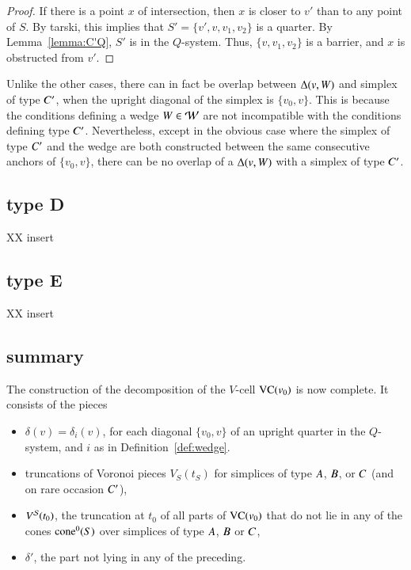 \begin{proof} If there is a point $x$ of intersection, then
$x$ is closer to $v'$ than to any point of $S$. 
By tarski, this implies that 
$S'=\{v',v,v_1,v_2\}$ is a quarter.  By Lemma~\ref{lemma:C'Q},
$S'$ is in the $Q$-system.  Thus, $\{v,v_1,v_2\}$ is a barrier,
and $x$ is obstructed from $v'$.
\end{proof}


Unlike the other cases, there can in fact be overlap between
$\Delta(v,W)$ and simplex of type $C'$, when the upright
diagonal of the simplex is $\{v_0,v\}$.  This is because the
conditions defining a wedge $W\in{\mathcal W}$ are not incompatible with
the conditions defining type $C'$.  Nevertheless, except in the
obvious case where the simplex of type $C'$ and the wedge are both
constructed between the same consecutive anchors of $\{v_0,v\}$, there
can be no overlap of a $\Delta(v,W)$ with a simplex of type
$C'$.

\subsection{type D}

XX insert

\subsection{type E}

XX insert


\subsection{summary}


The construction of the decomposition of the $V$-cell ${\operatorname{VC}}(v_0)$
is now complete. It consists of the pieces

    \begin{itemize}
    \item $\delta(v)=\delta_i(v)$,
         for each diagonal $\{v_0,v\}$ of an upright quarter
        in the $Q$-system, and $i$ as in Definition~\ref{def:wedge}.
    \item truncations of Voronoi pieces $V_S(t_S)$ for simplices of type
        $A$, $B$, or $C$ (and on rare occasion $C'$),
    \item $V^{{\mathcal S}}(t_0)$, the truncation at $t_0$ of all parts of
        ${\operatorname{VC}}(v_0)$ that do not lie in any of the cones ${\operatorname{cone}}^0(S)$ over
        simplices
        of type $A$, $B$ or $C$,
    \item $\delta'$, the part not lying in any of the preceding.
    \end{itemize}





